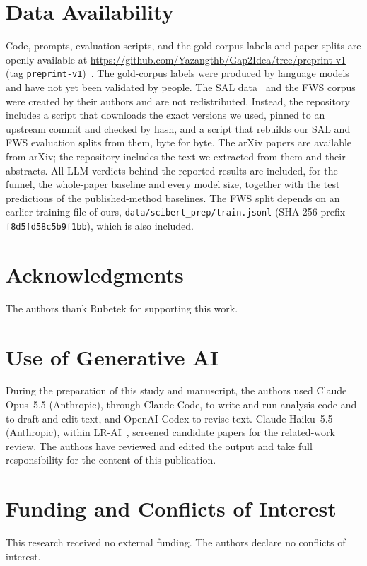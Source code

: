 \documentclass[11pt,a4paper]{article}
\begin{document}
\section*{Data Availability}
Code, prompts, evaluation scripts, and the gold-corpus labels and paper splits are openly available at \url{https://github.com/Yazangthb/Gap2Idea/tree/preprint-v1} (tag \texttt{preprint-v1})~\cite{gap2idearepo}. The gold-corpus labels were produced by language models and have not yet been validated by people. The SAL data~\cite{salrepo} and the FWS corpus~\cite{fwsrepo} were created by their authors and are not redistributed. Instead, the repository includes a script that downloads the exact versions we used, pinned to an upstream commit and checked by hash, and a script that rebuilds our SAL and FWS evaluation splits from them, byte for byte. The arXiv papers are available from arXiv; the repository includes the text we extracted from them and their abstracts. All LLM verdicts behind the reported results are included, for the funnel, the whole-paper baseline and every model size, together with the test predictions of the published-method baselines. The FWS split depends on an earlier training file of ours, \texttt{data/scibert\_prep/train.jsonl} (SHA-256 prefix \texttt{f8d5fd58c5b9f1bb}), which is also included.

\section*{Acknowledgments}
The authors thank Rubetek for supporting this work.

\section*{Use of Generative AI}
During the preparation of this study and manuscript, the authors used Claude Opus~5.5 (Anthropic), through Claude Code, to write and run analysis code and to draft and edit text, and OpenAI Codex to revise text. Claude Haiku~5.5 (Anthropic), within LR-AI~\cite{alnakri2026lrai}, screened candidate papers for the related-work review. The authors have reviewed and edited the output and take full responsibility for the content of this publication.

\section*{Funding and Conflicts of Interest}
This research received no external funding. The authors declare no conflicts of interest.

\appendix




\end{document}
